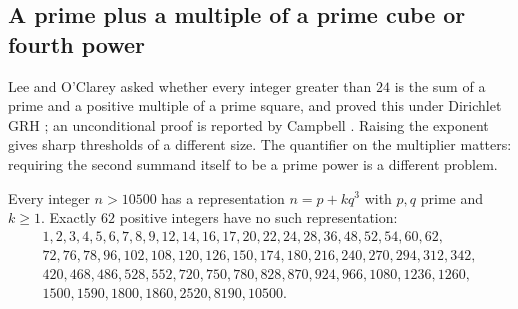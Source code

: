 \subsection{A prime plus a multiple of a prime cube or fourth power}
\label{dir:sec:cube}

Lee and O'Clarey asked whether every integer greater than $24$ is the sum of a prime
and a positive multiple of a prime square, and proved this under Dirichlet GRH
\cite[Theorem~1.3]{LeeOClarey2026Prime}; an unconditional proof is reported by Campbell
\cite{Campbell2026Prime}. Raising the exponent gives sharp thresholds of a different
size. The quantifier on the multiplier matters: requiring the second summand itself to
be a prime power is a different problem.

\begin{theorem}\label{dir:thm:cube}
Every integer $n>10500$ has a representation $n=p+kq^3$ with $p,q$ prime and $k\ge1$.
Exactly $62$ positive integers have no such representation:
\[
\begin{gathered}
1,2,3,4,5,6,7,8,9,12,14,16,17,20,22,24,28,36,48,52,54,60,62,\\
72,76,78,96,102,108,120,126,150,174,180,216,240,270,294,312,342,\\
420,468,486,528,552,720,750,780,828,870,924,966,1080,1236,1260,\\
1500,1590,1800,1860,2520,8190,10500 .
\end{gathered}
\]
\end{theorem}

